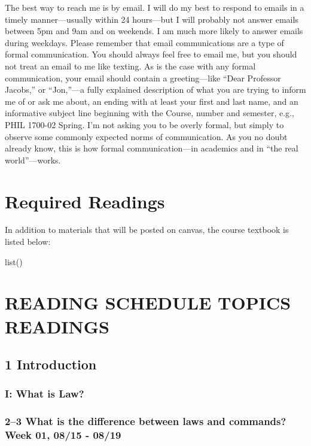 \documentclass[11pt,]{article}
\begin{document}
The best way to reach me is by email. I will do my best to respond to
emails in a timely manner---usually within 24 hours---but I will
probably not answer emails between 5pm and 9am and on weekends. I am
much more likely to answer emails during weekdays. Please remember that
email communications are a type of formal communication. You should
always feel free to email me, but you should not treat an email to me
like texting. As is the case with any formal communication, your email
should contain a greeting---like ``Dear Professor Jacobs,'' or
``Jon,''---a fully explained description of what you are trying to
inform me of or ask me about, an ending with at least your first and
last name, and an informative subject line beginning with the Course,
number and semester, e.g., PHIL 1700-02 Spring. I'm not asking you to be
overly formal, but simply to observe some commonly expected norms of
communication. As you no doubt already know, this is how formal
communication---in academics and in ``the real world''---works.

\section{Required Readings}\label{required-readings}

In addition to materials that will be posted on canvas, the course
textbook is listed below:

list()

\section{READING SCHEDULE TOPICS
READINGS}\label{reading-schedule-topics-readings}

\subsection{1 Introduction}\label{introduction}

\subsubsection{I: What is Law?}\label{i-what-is-law}

\subsubsection{2--3 What is the difference between laws and commands?
Week 01, 08/15 -
08/19}\label{what-is-the-difference-between-laws-and-commands-week-01-0815---0819}
\end{document}
